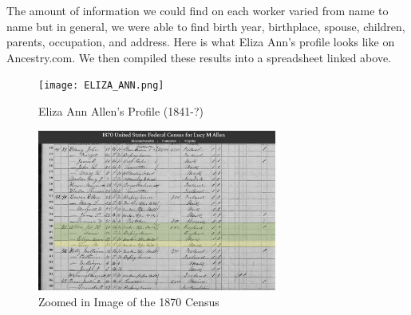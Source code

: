 \documentclass[
  letterpaper,
  DIV=11,
  numbers=noendperiod]{scrartcl}
\begin{document}
The amount of information we could find on each worker varied from name
to name but in general, we were able to find birth year, birthplace,
spouse, children, parents, occupation, and address. Here is what Eliza
Ann's profile looks like on Ancestry.com. We then compiled these results
into a spreadsheet linked above.

\begin{figure}

{\centering \texttt{[image: ELIZA\_ANN.png]}

}

\caption{\label{fig-sample12}Eliza Ann Allen's Profile (1841-?)}

\end{figure}

\begin{figure}

{\centering \includegraphics[width=0.7\textwidth,height=\textheight]{Allens family 1870 census Data.png}

}

\caption{\label{fig-sample13}Zoomed in Image of the 1870 Census}

\end{figure}
\end{document}
